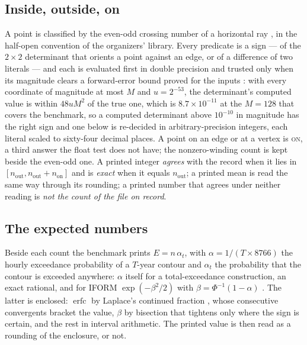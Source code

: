 \documentclass[preprint,11pt,authoryear]{elsarticle}
\begin{document}
\subsection{Inside, outside, on}
A point is classified by the even-odd crossing number of a horizontal ray \citep{shimrat1962,hormann2001}, in the half-open convention of the organizers' library. Every predicate is a sign --- of the $2\times 2$ determinant that orients a point against an edge, or of a difference of two literals --- and each is evaluated first in double precision and trusted only when its magnitude clears a forward-error bound proved for the inputs \citep{higham2002,fortune1996}: with every coordinate of magnitude at most $M$ and $u = 2^{-53}$, the determinant's computed value is within $48uM^2$ of the true one, which is $8.7\times10^{-11}$ at the $M = 128$ that covers the benchmark, so a computed determinant above $10^{-10}$ in magnitude has the right sign and one below is re-decided in arbitrary-precision integers, each literal scaled to sixty-four decimal places. A point on an edge or at a vertex is \textsc{on}, a third answer the float test does not have; the nonzero-winding count is kept beside the even-odd one. A printed integer \emph{agrees} with the record when it lies in $[n_{\mathrm{out}}, n_{\mathrm{out}} + n_{\mathrm{on}}]$ and is \emph{exact} when it equals $n_{\mathrm{out}}$; a printed mean is read the same way through its rounding; a printed number that agrees under neither reading is \emph{not the count of the file on record}.

\subsection{The expected numbers}
Beside each count the benchmark prints $E = n\,\alpha_t$, with $\alpha = 1/(T \times 8766)$ the hourly exceedance probability of a $T$-year contour and $\alpha_t$ the probability that the contour is exceeded anywhere: $\alpha$ itself for a total-exceedance construction, an exact rational, and for IFORM $\exp(-\beta^2/2)$ with $\beta = \Phi^{-1}(1-\alpha)$ \citep{mackay2021}. The latter is enclosed: $\operatorname{erfc}$ by Laplace's continued fraction \citep[\S7.1.14]{abramowitz1964}, whose consecutive convergents bracket the value, $\beta$ by bisection that tightens only where the sign is certain, and the rest in interval arithmetic. The printed value is then read as a rounding of the enclosure, or not.
\end{document}
